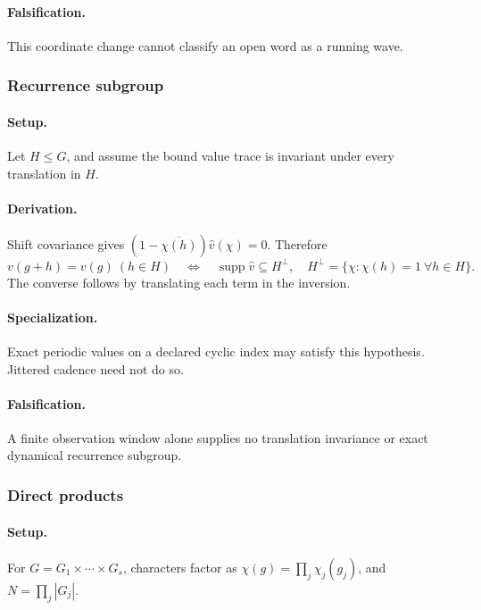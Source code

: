 \paragraph{Falsification.} This coordinate change cannot classify an open
word as a running wave.


\subsubsection{Recurrence subgroup}
\paragraph{Setup.}
Let \(H\le G\), and assume the bound value trace is invariant under every
translation in \(H\).
\paragraph{Derivation.} Shift covariance gives
\((1-\overline{\chi(h)})\widehat v(\chi)=0\). Therefore
\begin{equation}
v(g+h)=v(g)\ (h\in H)
\quad\Longleftrightarrow\quad
\operatorname{supp}\widehat v\subseteq H^\perp,
\quad H^\perp=\{\chi:\chi(h)=1\ \forall h\in H\}.
\label{eq:fourier-recurrence-support}
\end{equation}
The converse follows by translating each term in the inversion.
\paragraph{Specialization.} Exact periodic values on a declared cyclic
index may satisfy this hypothesis. Jittered cadence need not do so.
\paragraph{Falsification.} A finite observation window alone supplies no
translation invariance or exact dynamical recurrence subgroup.


\subsubsection{Direct products}
\paragraph{Setup.}
For \(G=G_1\times\cdots\times G_s\), characters factor as
\(\chi(g)=\prod_j\chi_j(g_j)\), and \(N=\prod_j|G_j|\).
